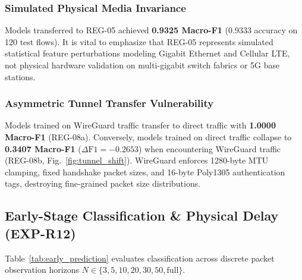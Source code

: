 \documentclass[conference]{IEEEtran}
\begin{document}
\subsubsection{Simulated Physical Media Invariance}
Models transferred to REG-05 achieved \textbf{0.9325 Macro-F1} (0.9333 accuracy on 120 test flows). It is vital to emphasize that REG-05 represents simulated statistical feature perturbations modeling Gigabit Ethernet and Cellular LTE, not physical hardware validation on multi-gigabit switch fabrics or 5G base stations.

\subsubsection{Asymmetric Tunnel Transfer Vulnerability}
Models trained on WireGuard traffic transfer to direct traffic with \textbf{1.0000 Macro-F1} (REG-08a). Conversely, models trained on direct traffic collapse to \textbf{0.3407 Macro-F1} ($\Delta\text{F1} = -0.2653$) when encountering WireGuard traffic (REG-08b, Fig.~\ref{fig:tunnel_shift}). WireGuard enforces 1280-byte MTU clamping, fixed handshake packet sizes, and 16-byte Poly1305 authentication tags, destroying fine-grained packet size distributions.

\subsection{Early-Stage Classification \& Physical Delay (EXP-R12)}
Table~\ref{tab:early_prediction} evaluates classification across discrete packet observation horizons $N \in \{3, 5, 10, 20, 30, 50, \text{full}\}$.
\end{document}
